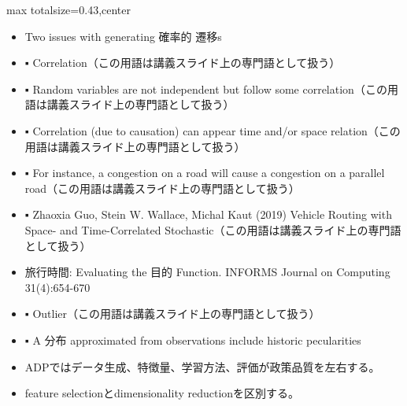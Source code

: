 \clearpage
{}
\begin{minipage}[t]{0.405\textwidth}
\begin{adjustbox}{max totalsize={\textwidth}{0.43\textheight},center}
\begin{minipage}{\textwidth}\scriptsize
{}\begin{itemize}
\item Two issues with generating 確率的 遷移s
\item ▪ Correlation（この用語は講義スライド上の専門語として扱う）
\item ▪ Random variables are not independent but follow some correlation（この用語は講義スライド上の専門語として扱う）
\item ▪ Correlation (due to causation) can appear time and/or space relation（この用語は講義スライド上の専門語として扱う）
\item ▪ For instance, a congestion on a road will cause a congestion on a parallel road（この用語は講義スライド上の専門語として扱う）
\item ▪ Zhaoxia Guo, Stein W. Wallace, Michal Kaut (2019) Vehicle Routing with Space- and Time-Correlated Stochastic（この用語は講義スライド上の専門語として扱う）
\item 旅行時間: Evaluating the 目的 Function. INFORMS Journal on Computing 31(4):654-670
\item ▪ Outlier（この用語は講義スライド上の専門語として扱う）
\item ▪ A 分布 approximated from observations include historic pecularities
\end{itemize}\begin{itemize}
\item ADPではデータ生成、特徴量、学習方法、評価が政策品質を左右する。
\item feature selectionとdimensionality reductionを区別する。
\end{itemize}
\end{minipage}
\end{adjustbox}
\end{minipage}\hfill
